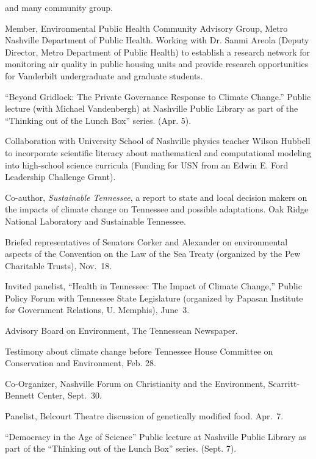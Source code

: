             and many community group.
\item[2017--present] Member, Environmental Public Health Community Advisory Group, Metro Nashville Department of Public Health. Working with Dr. Sanmi Areola (Deputy Director, Metro Department of Public Health)
to establish a research network for monitoring air quality in public housing units and provide research opportunities for Vanderbilt undergraduate and graduate students.
\item[2017] ``Beyond Gridlock: The Private Governance Response to Climate Change.'' Public lecture (with Michael Vandenbergh) at Nashville Public Library as part of the ``Thinking out of the Lunch Box'' series. (Apr. 5).
\item[2015--2017] Collaboration with University School of Nashville physics teacher Wilson Hubbell to incorporate scientific literacy about mathematical and computational modeling into high-school science curricula (Funding for USN from an Edwin E. Ford Leadership Challenge Grant).
\item[2011--2012] Co-author, \emph{Sustainable Tennessee}, a report to state and local decision makers on the impacts of climate change on Tennessee and possible adaptations. Oak Ridge National Laboratory and Sustainable Tennessee.
\item[2009] Briefed representatives of Senators Corker and Alexander on environmental aspects of the Convention on the Law of the Sea Treaty (organized by the Pew Charitable Trusts), Nov.~18.
\item[2009] Invited panelist, ``Health in Tennessee: The Impact of Climate Change,'' Public Policy Forum with Tennessee State Legislature (organized by Papasan Institute for Government Relations, U. Memphis), June~3.
\item[2007--2009] Advisory Board on Environment, The Tennessean Newspaper.
\item[2008] Testimony about climate change before Tennessee House Committee on Conservation and Environment, Feb. 28.
\item[2006] Co-Organizer, Nashville Forum on Christianity and the Environment, Scarritt-Bennett Center, Sept.~30.
\item[2006] Panelist, Belcourt Theatre discussion of genetically modified food. Apr.~7.
\item[2005] ``Democracy in the Age of Science'' Public lecture at Nashville Public Library as part of the ``Thinking out of the Lunch Box'' series. (Sept. 7).
